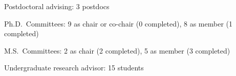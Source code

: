 \begin{veryTightItemize}
    \item Postdoctoral advising: 3 postdocs
    \item Ph.D.\ Committees: 9 as chair or co-chair (0 completed), 8 as member (1 completed)
    \item M.S.\ Committees:  2 as chair (2 completed), 5 as member (3 completed)
    \item Undergraduate research advisor: 15 students
\end{veryTightItemize}
